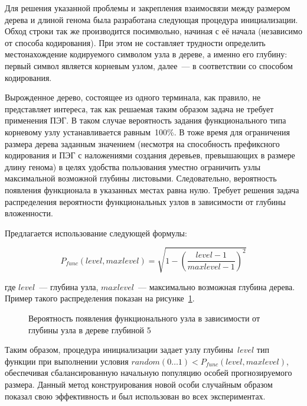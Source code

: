 Для решения указанной проблемы и закрепления взаимосвязи между размером дерева и длиной генома была разработана следующая процедура инициализации. Обход строки так же производится посимвольно, начиная с её начала (независимо от способа кодирования). При этом не составляет трудности определить местонахождение кодируемого символом узла в дереве, а именно его глубину: первый символ является корневым узлом, далее~--- в соответствии со способом кодирования.

Вырожденное дерево, состоящее из одного терминала, как правило, не представляет интереса, так как решаемая таким образом задача не требует применения ПЭГ. В таком случае вероятность задания функционального типа корневому узлу устанавливается равным~100\%. В тоже время для ограничения размера дерева заданным значением (несмотря на способность префиксного кодирования и ПЭГ с наложениями создания деревьев, превышающих в размере длину генома) в целях удобства пользования уместно ограничить узлы максимальной возможной глубины листовыми. Следовательно, вероятность появления функционала в указанных местах равна нулю. Требует решения задача распределения вероятности функциональных узлов в зависимости от глубины вложенности.

Предлагается использование следующей формулы:

\begin{equation}
\label{eq:init_func_prob}
P_{func}(level, maxlevel) = \sqrt{1 - \left(\frac{level - 1}{maxlevel - 1}\right)^2}
\end{equation}

где $level$~--- глубина узла, $maxlevel$~--- максимально возможная глубина дерева. Пример такого распределения показан на рисунке~\ref{img:init_func_prob}.

\begin{figure} [h]
  \center
  \caption{Вероятность появления функционального узла в зависимости от глубины узла в дереве глубиной 5}
  \label{img:init_func_prob}
\end{figure}

Таким образом, процедура инициализации задает узлу глубины~$level$ тип функции при выполнении условия $random(0\ldots1) < P_{func}(level, maxlevel)$, обеспечивая сбалансированную начальную популяцию особей прогнозируемого размера. Данный метод конструирования новой особи случайным образом показал свою эффективность и был использован во всех экспериментах.




